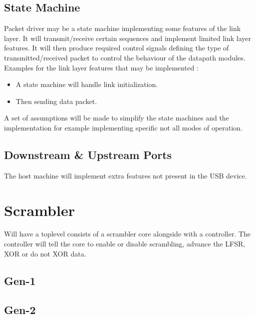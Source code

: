 \documentclass[11pt,a4paper]{article}
\begin{document}
\subsection{State Machine}
Packet driver may be a state machine implementing some features of the link layer. It will transmit/receive certain sequences and implement limited link layer features. It will then produce required control signals defining the type of transmitted/received packet to control the behaviour of the datapath modules.
Examples for the link layer features that may be implemented :
\begin{itemize}
	\item A state machine will handle link initialization.
	\item Then sending data packet.
\end{itemize}

A set of assumptions will be made to simplify the state machines and the implementation for example implementing specific not all modes of operation.

\subsection{Downstream \& Upstream Ports}
The host machine will implement extra features not present in the USB device.


\section{Scrambler}
Will have a toplevel consists of a scrambler core alongside with a controller. The controller will tell the core to enable or disable scrambling, advance the LFSR, XOR or do not XOR data.


\subsection{Gen-1}

\subsection{Gen-2}
\end{document}
